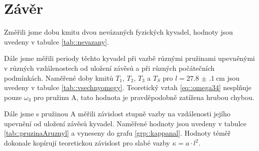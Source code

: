 \section*{Závěr}
Změřili jsme dobu kmitu dvou nevázaných fyzických kyvadel, hodnoty jsou uvedeny v tabulce \ref{tab::nevazany}.

Dále jsme měřili periody těchto kyvadel při vazbě různými pružinami upevněnými v různých vzdálenostech od uložení závěsů a při různých počátečních podmínkách.
Naměřené doby kmitů $T_1$, $T_2$, $T_3$ a $T_S$ pro $l = \SI{27.8(1)}{\cm}$ jsou uvedeny v tabulce \ref{tab::vsechnyomegy}.
Teoretický vztah \eqref{eq::omega34} nesplňuje pouze $\omega_3$ pro pružinu A, tato hodnota je pravděpodobně zatížena hrubou chybou.

Dále jsme s pružinou A měřili závislost stupně vazby na vzdálenosti jejího upevnění od uložení závěsů kyvadel.
Naměřené hodnoty jsou uvedeny v tabulce \ref{tab::pruzinaAruznyl} a vyneseny do grafu \ref{grp::kappanal}.
Hodnoty téměř dokonale kopírují teoretickou závislost pro slabé vazby $\kappa = a \cdot l^2$.